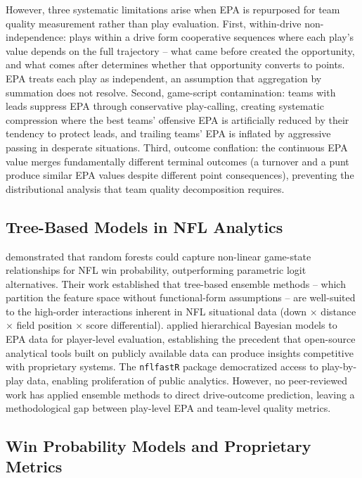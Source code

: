 \documentclass[12pt,a4paper]{article}
\begin{document}
However, three systematic limitations arise when EPA is repurposed for team quality measurement rather than play evaluation. First, within-drive non-independence: plays within a drive form cooperative sequences where each play's value depends on the full trajectory -- what came before created the opportunity, and what comes after determines whether that opportunity converts to points. EPA treats each play as independent, an assumption that aggregation by summation does not resolve. Second, game-script contamination: teams with leads suppress EPA through conservative play-calling, creating systematic compression where the best teams' offensive EPA is artificially reduced by their tendency to protect leads, and trailing teams' EPA is inflated by aggressive passing in desperate situations. Third, outcome conflation: the continuous EPA value merges fundamentally different terminal outcomes (a turnover and a punt produce similar EPA values despite different point consequences), preventing the distributional analysis that team quality decomposition requires.

\subsection{Tree-Based Models in NFL Analytics}

\citet{lock2014randomforests} demonstrated that random forests could capture non-linear game-state relationships for NFL win probability, outperforming parametric logit alternatives. Their work established that tree-based ensemble methods -- which partition the feature space without functional-form assumptions -- are well-suited to the high-order interactions inherent in NFL situational data (down $\times$ distance $\times$ field position $\times$ score differential). \citet{yurko2019nflwar} applied hierarchical Bayesian models to EPA data for player-level evaluation, establishing the precedent that open-source analytical tools built on publicly available data can produce insights competitive with proprietary systems. The \texttt{nflfastR} package \citep{carl2021nflfastr} democratized access to play-by-play data, enabling proliferation of public analytics. However, no peer-reviewed work has applied ensemble methods to direct drive-outcome prediction, leaving a methodological gap between play-level EPA and team-level quality metrics.

\subsection{Win Probability Models and Proprietary Metrics}
\end{document}
